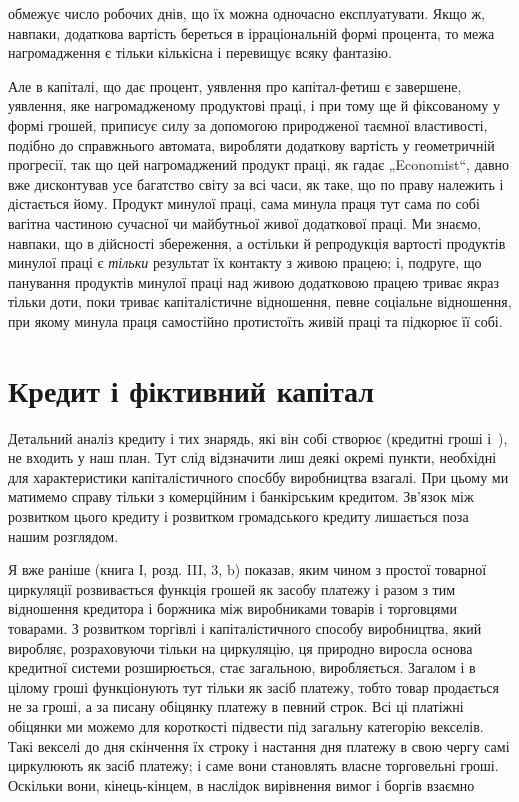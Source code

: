 \parcont{}  %
обмежує число робочих днів, що їх можна одночасно експлуатувати.
Якщо ж, навпаки, додаткова вартість береться в ірраціональній
формі процента, то межа нагромадження є тільки кількісна
і перевищує всяку фантазію.

Але в капіталі, що дає процент, уявлення про капітал-фетиш
є завершене, уявлення, яке нагромадженому продуктові праці,
і при тому ще й фіксованому у формі грошей, приписує силу за
допомогою природженої таємної властивості, подібно до справжнього
автомата, виробляти додаткову вартість у геометричній
прогресії, так що цей нагромаджений продукт праці, як гадає
„Economist“, давно вже дисконтував усе багатство світу за всі
часи, як таке, що по праву належить і дістається йому. Продукт
минулої праці, сама минула праця тут сама по собі вагітна частиною
сучасної чи майбутньої живої додаткової праці. Ми знаємо,
навпаки, що в дійсності збереження, а остільки й репродукція
вартості продуктів минулої праці є \emph{тільки} результат їх
контакту з живою працею; і, подруге, що панування продуктів
минулої праці над живою додатковою працею триває якраз тільки
доти, поки триває капіталістичне відношення, певне соціальне
відношення, при якому минула праця самостійно протистоїть
живій праці та підкорює її собі.

\section{Кредит і фіктивний капітал}

Детальний аналіз кредиту і тих знарядь, які він собі створює
(кредитні гроші і~), не входить у наш план. Тут слід відзначити
лиш деякі окремі пункти, необхідні для характеристики
капіталістичного спосббу виробництва взагалі. При цьому ми
матимемо справу тільки з комерційним і банкірським кредитом.
Зв’язок між розвитком цього кредиту і розвитком громадського
кредиту лишається поза нашим розглядом.

Я вже раніше (книга І, розд. III, 3, b) показав, яким чином
з простої товарної циркуляції розвивається функція грошей як
засобу платежу і разом з тим відношення кредитора і боржника
між виробниками товарів і торговцями товарами. З розвитком
торгівлі і капіталістичного способу виробництва, який
виробляє, розраховуючи тільки на циркуляцію, ця природно виросла
основа кредитної системи розширюється, стає загальною,
виробляється. Загалом і в цілому гроші функціонують тут тільки
як засіб платежу, тобто товар продається не за гроші, а за
писану обіцянку платежу в певний строк. Всі ці платіжні обіцянки
ми можемо для короткості підвести під загальну категорію
векселів. Такі векселі до дня скінчення їх строку і настання
дня платежу в свою чергу самі циркулюють як засіб платежу;
і саме вони становлять власне торговельні гроші. Оскільки вони,
кінець-кінцем, в наслідок вирівнення вимог і боргів взаємно
\parbreak{}  %
